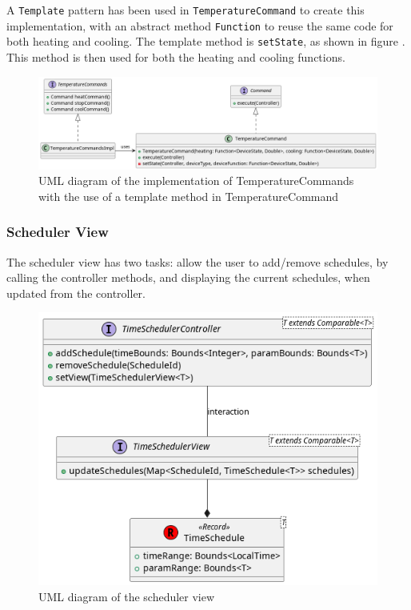A \texttt{Template} pattern has been used in \texttt{TemperatureCommand} to create this implementation,
with an abstract method \texttt{Function} to reuse the same code for both heating and cooling.
The template method is \texttt{setState}, as shown in figure .
This method is then used for both the heating and cooling functions.

\begin{figure}[H]
\centering{}
\includegraphics[width=\textwidth,height=\textheight,keepaspectratio]{magnani/uml/temperaturecommand.png}
\caption{UML diagram of the implementation of TemperatureCommands with the use of a template method in TemperatureCommand}
\label{magnani:uml:temperaturecommand}
\end{figure}

\subsubsection{Scheduler View}

The scheduler view has two tasks: allow the user to add/remove schedules, by calling the controller methods,
and displaying the current schedules, when updated from the controller.

\begin{figure}[H]
\centering{}
\includegraphics[width=\textwidth,height=\textheight,keepaspectratio]{magnani/uml/scheduler-view.png}
\caption{UML diagram of the scheduler view}
\label{magnani:uml:scheduler-view}
\end{figure}
